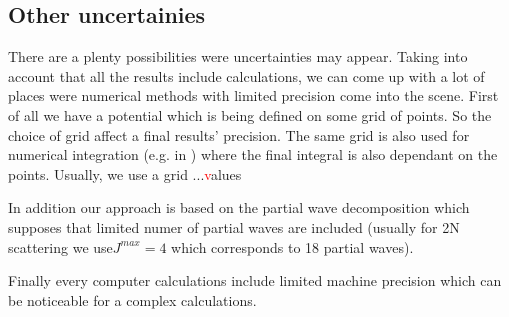     \subsection*{Other uncertainies}

    There are a plenty possibilities were uncertainties may appear. 
    Taking into account that all the results include calculations,
    we can come up with a lot of places were numerical methods with limited 
    precision come into the scene. First of all we have a potential which 
    is being defined on some grid of points. So the choice of grid affect
    a final results' precision. The same grid is also used for numerical integration
    (e.g. in ) where the final integral is also dependant on the points.
    Usually, we use a grid ...{\textcolor{red} values}

    In addition our approach is based on the partial wave decomposition which
    supposes that limited numer of partial waves are included 
    (usually for 2N scattering we use$J^{max}=4$ which corresponds to 18 partial waves).

    Finally every computer calculations include limited machine precision which
    can be noticeable for a complex calculations. 






















